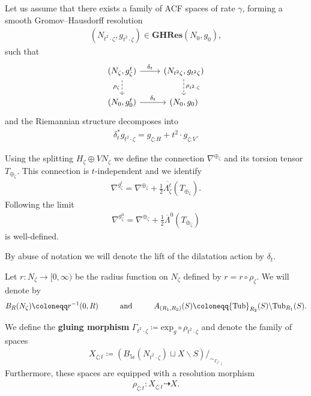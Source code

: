 \documentclass[psamsfonts]{amsart}
\theoremstyle{plain}
\theoremstyle{definition}{
\newtheorem{defi}{Definition}[section]
\newtheorem{ass}{Assumption}
\newtheorem*{nota}{Notation}}
\theoremstyle{remark}{
\newtheorem{rem}{Remark}
\newtheorem{ex}{Example}}
\theoremstyle{plain}{
\newtheorem{thm}{Theorem}[section]
\newtheorem{lem}{Lemma}[section]
\newtheorem{cor}{Corollary}[section]
\newtheorem{prop}{Proposition}[section]
\newtheorem{con}{Conjecture}[section]}
\newcommand{\m}[1]{{\mathrm{#1}}}
\newcommand{\cat}[1]{\textbf{#1}}
\newcommand{\und}[1]{\hspace{#1}\text{and}\hspace{#1}}
\begin{document}
Let us assume that there exists a family of ACF spaces of rate $\gamma$, forming a smooth Gromov--Hausdorff resolution 
\begin{align*}
    (N_{t^2\cdot\zeta},g_{t^2\cdot \zeta})\in\cat{GHRes}(N_0,g_0),
\end{align*}
such that
\begin{equation*}
\begin{tikzcd}
        (N_\zeta,g^t_\zeta)\arrow[d,dashed,"\rho_\zeta",swap]\arrow[r,"\delta_t"]&(N_{t^2\zeta},g_{t^2\zeta})\arrow[d,dashed,"\rho_{t^2\cdot\zeta}"]\\
        (N_0,g^t_0)\arrow[r,"\delta_t"]&(N_0,g_0)
\end{tikzcd}
\end{equation*}
and the Riemannian structure decomposes into 
\begin{align*}
    \delta_t^*g_{t^2\cdot \zeta}=g_{\zeta;H}+t^2\cdot g_{\zeta;V}.
\end{align*}


Using the splitting $H_\zeta\oplus VN_\zeta$ we define the connection $ \nabla^{\oplus_\zeta}$ and its torsion tensor $T_{\oplus_\zeta}$. This connection is $t$-independent and we identify
\begin{align*}
    \nabla^{g^t_\zeta}=\nabla^{\oplus_\zeta}+\frac{1}{2}\overline{\Lambda^t_\zeta}(T_{\oplus_\zeta}).
\end{align*}
Following \cite[(10.3)]{berline1992heat} the limit 
\begin{align*}
    \nabla^{g^0_\zeta}=\nabla^{\oplus_\zeta}+\frac{1}{2}\overline{\Lambda}^0(T_{\oplus_\zeta})
\end{align*}
is well-defined. 




\begin{rem}
    By abuse of notation we will denote the lift of the dilatation action by $\delta_t$.
\end{rem}


\begin{nota}
    Let $r\colon N_\zeta\rightarrow[0,\infty)$ be the radius function on $N_\zeta$ defined by $r=r\circ \rho_\zeta$. We will denote by
    \begin{align*}
        B_{R}(N_\zeta)\coloneqq r^{-1}(0,R)\und{1.0cm}A_{(R_1,R_2)}(S)\coloneqq\m{Tub}_{R_2}(S)\backslash \m{Tub}_{R_1}(S).
    \end{align*}
\end{nota}
\begin{defi}
We define the \textbf{gluing morphism} $\Gamma_{t^2\cdot\zeta}\coloneqq \m{exp}_g\circ \rho_{t^2\cdot\zeta}$ and denote the family of spaces
\begin{align*}
    X_{\zeta;t}\coloneqq(B_{5\epsilon}(N_{t^2\cdot\zeta})\sqcup X\backslash S)/_{\sim_ {\Gamma_{t^2\cdot\zeta}}}
\end{align*}
Furthermore, these spaces are equipped with a resolution morphism 
\begin{align*}
    \rho_{\zeta;t}\colon X_{\zeta;t}\dashrightarrow X.
\end{align*}
\end{defi}
\end{document}
